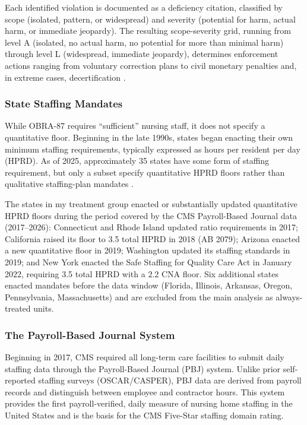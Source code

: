 \documentclass[12pt]{article}
\begin{document}
Each identified violation is documented as a deficiency citation, classified by scope (isolated, pattern, or widespread) and severity (potential for harm, actual harm, or immediate jeopardy). The resulting scope-severity grid, running from level A (isolated, no actual harm, no potential for more than minimal harm) through level L (widespread, immediate jeopardy), determines enforcement actions ranging from voluntary correction plans to civil monetary penalties and, in extreme cases, decertification \citep{cms2023som}.

\subsubsection*{State Staffing Mandates} While OBRA-87 requires ``sufficient'' nursing staff, it does not specify a quantitative floor. Beginning in the late 1990s, states began enacting their own minimum staffing requirements, typically expressed as hours per resident per day (HPRD). As of 2025, approximately 35 states have some form of staffing requirement, but only a subset specify quantitative HPRD floors rather than qualitative staffing-plan mandates \citep{harrington2020}.

The states in my treatment group enacted or substantially updated quantitative HPRD floors during the period covered by the CMS Payroll-Based Journal data (2017--2026): Connecticut and Rhode Island updated ratio requirements in 2017; California raised its floor to 3.5 total HPRD in 2018 (AB 2079); Arizona enacted a new quantitative floor in 2019; Washington updated its staffing standards in 2019; and New York enacted the Safe Staffing for Quality Care Act in January 2022, requiring 3.5 total HPRD with a 2.2 CNA floor. Six additional states enacted mandates before the data window (Florida, Illinois, Arkansas, Oregon, Pennsylvania, Massachusetts) and are excluded from the main analysis as always-treated units.

\subsubsection*{The Payroll-Based Journal System} Beginning in 2017, CMS required all long-term care facilities to submit daily staffing data through the Payroll-Based Journal (PBJ) system. Unlike prior self-reported staffing surveys (OSCAR/CASPER), PBJ data are derived from payroll records and distinguish between employee and contractor hours. This system provides the first payroll-verified, daily measure of nursing home staffing in the United States and is the basis for the CMS Five-Star staffing domain rating.
\end{document}
